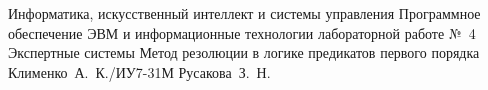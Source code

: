 \documentclass{bmstu}
\begin{document}
\makereporttitle
    {Информатика, искусственный интеллект и системы управления} %
    {Программное обеспечение ЭВМ и информационные технологии} %
    {лабораторной работе №~4} %
    {Экспертные системы} %
    {Метод резолюции в логике предикатов первого порядка} %
    {} %
    {Клименко~А.~К./ИУ7-31М} %
    {Русакова~З.~Н.} %





\end{document}
